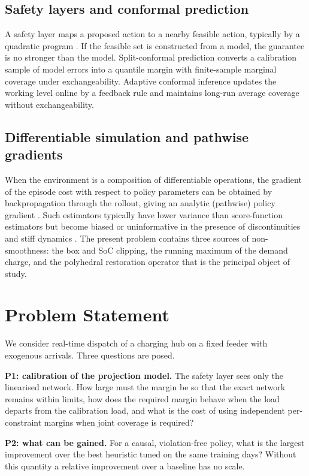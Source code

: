 \documentclass[11pt]{article}
\begin{document}
\subsection{Safety layers and conformal prediction}
A safety layer maps a proposed action to a nearby feasible action, typically by a quadratic program \cite{optnet,cvxpylayers,dalal}. If the feasible set is constructed from a model, the guarantee is no stronger than the model. Split-conformal prediction \cite{vovk,lei,angelopoulos} converts a calibration sample of model errors into a quantile margin with finite-sample marginal coverage under exchangeability. Adaptive conformal inference \cite{aci} updates the working level online by a feedback rule and maintains long-run average coverage without exchangeability.

\subsection{Differentiable simulation and pathwise gradients}
When the environment is a composition of differentiable operations, the gradient of the episode cost with respect to policy parameters can be obtained by backpropagation through the rollout, giving an analytic (pathwise) policy gradient \cite{heess,shac}. Such estimators typically have lower variance than score-function estimators but become biased or uninformative in the presence of discontinuities and stiff dynamics \cite{suh,metz}. The present problem contains three sources of non-smoothness: the box and SoC clipping, the running maximum of the demand charge, and the polyhedral restoration operator that is the principal object of study.

\section{Problem Statement}\label{sec:problem}
We consider real-time dispatch of a charging hub on a fixed feeder with exogenous arrivals. Three questions are posed.

\textbf{P1: calibration of the projection model.} The safety layer sees only the linearised network. How large must the margin be so that the exact network remains within limits, how does the required margin behave when the load departs from the calibration load, and what is the cost of using independent per-constraint margins when joint coverage is required?

\textbf{P2: what can be gained.} For a causal, violation-free policy, what is the largest improvement over the best heuristic tuned on the same training days? Without this quantity a relative improvement over a baseline has no scale.
\end{document}

